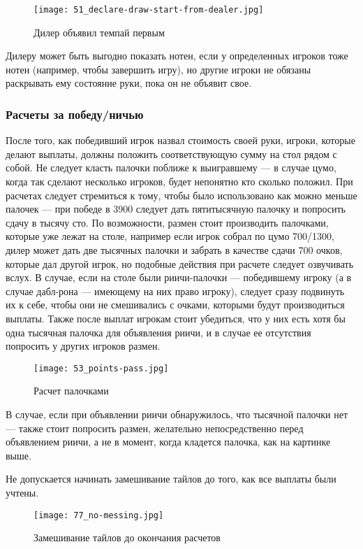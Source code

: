 \begin{figure}[H]
	\centering
	\texttt{[image: 51\_declare-draw-start-from-dealer.jpg]}
	\caption{Дилер объявил темпай первым}
\end{figure}

Дилеру может быть выгодно показать нотен, если у определенных игроков тоже нотен (например, чтобы завершить игру), но другие игроки не обязаны раскрывать ему состояние руки, пока он не объявит свое.

\subsubsection{Расчеты за победу/ничью}

После того, как победивший игрок назвал стоимость своей руки, игроки, которые делают выплаты, должны положить соответствующую сумму на стол рядом с собой. Не следует класть палочки поближе к выигравшему --- в случае цумо, когда так сделают несколько игроков, будет непонятно кто сколько положил. При расчетах следует стремиться к тому, чтобы было использовано как можно меньше палочек --- при победе в 3900 следует дать пятитысячную палочку и попросить сдачу в тысячу сто. По возможности, размен стоит производить палочками, которые уже лежат на столе, например если игрок собрал по цумо 700/1300, дилер может дать две тысячных палочки и забрать в качестве сдачи 700 очков, которые дал другой игрок, но подобные действия при расчете следует озвучивать вслух. В случае, если на столе были риичи-палочки --- победившему игроку (а в случае дабл-рона --- имеющему на них право игроку), следует сразу подвинуть их к себе, чтобы они не смешивались с очками, которыми будут производиться выплаты. Также после выплат игрокам стоит убедиться, что у них есть хотя бы одна тысячная палочка для объявления риичи, и в случае ее отсутствия попросить у других игроков размен.

\begin{figure}[H]
	\centering
	\texttt{[image: 53\_points-pass.jpg]}
	\caption{Расчет палочками}
\end{figure}

В случае, если при объявлении риичи обнаружилось, что тысячной палочки нет --- также стоит попросить размен, желательно непосредственно перед объявлением риичи, а не в момент, когда кладется палочка, как на картинке выше.

Не допускается начинать замешивание тайлов до того, как все выплаты были учтены.

\begin{figure}[H]
	\centering
	\texttt{[image: 77\_no-messing.jpg]}
	\caption{Замешивание тайлов до окончания расчетов}
\end{figure}

